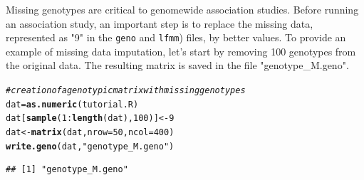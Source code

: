 \documentclass[12pt,a4paper,oneside]{article}\usepackage[]{graphicx}\usepackage[]{color}
\makeatletter
\newcommand{\hlnum}[1]{\textcolor[rgb]{0.686,0.059,0.569}{#1}}%
\newcommand{\hlstr}[1]{\textcolor[rgb]{0.192,0.494,0.8}{#1}}%
\newcommand{\hlcom}[1]{\textcolor[rgb]{0.678,0.584,0.686}{\textit{#1}}}%
\newcommand{\hlopt}[1]{\textcolor[rgb]{0,0,0}{#1}}%
\newcommand{\hlstd}[1]{\textcolor[rgb]{0.345,0.345,0.345}{#1}}%
\newcommand{\hlkwb}[1]{\textcolor[rgb]{0.69,0.353,0.396}{#1}}%
\newcommand{\hlkwc}[1]{\textcolor[rgb]{0.333,0.667,0.333}{#1}}%
\newcommand{\hlkwd}[1]{\textcolor[rgb]{0.737,0.353,0.396}{\textbf{#1}}}%
\newenvironment{kframe}{%
 \def\at@end@of@kframe{}%
 \ifinner\ifhmode%
  \def\at@end@of@kframe{\end{minipage}}%
  \begin{minipage}{\columnwidth}%
 \fi\fi%
 \def\FrameCommand##1{\hskip\@totalleftmargin \hskip-\fboxsep
 \colorbox{shadecolor}{##1}\hskip-\fboxsep
     \hskip-\linewidth \hskip-\@totalleftmargin \hskip\columnwidth}%
 \MakeFramed {\advance\hsize-\width
   \@totalleftmargin\z@ \linewidth\hsize
   \@setminipage}}%
 {\par\unskip\endMakeFramed%
 \at@end@of@kframe}
\newenvironment{knitrout}{}{} %
\makeatother
\begin{document}
Missing genotypes are critical to genomewide association studies. Before running an association study, an important step is to replace the missing data, represented as "9" in the {\tt geno} and {\tt lfmm}) files, by better values. To provide an example of missing data imputation, let's start by removing 100 genotypes from the original data.
The resulting matrix is saved in the file "genotype_M.geno".
\begin{knitrout}
\color{fgcolor}\begin{kframe}
\begin{alltt}
\hlcom{# creation of a genotypic matrix  with missing genotypes}
\hlstd{dat} \hlkwb{=} \hlkwd{as.numeric}\hlstd{(tutorial.R)}
\hlstd{dat[}\hlkwd{sample}\hlstd{(}\hlnum{1}\hlopt{:}\hlkwd{length}\hlstd{(dat),} \hlnum{100}\hlstd{)]} \hlkwb{<-}  \hlnum{9}
\hlstd{dat} \hlkwb{<-} \hlkwd{matrix}\hlstd{(dat,} \hlkwc{nrow} \hlstd{=} \hlnum{50}\hlstd{,} \hlkwc{ncol} \hlstd{=} \hlnum{400}\hlstd{)}
\hlkwd{write.geno}\hlstd{(dat,} \hlstr{"genotype_M.geno"}\hlstd{)}
\end{alltt}
\begin{verbatim}
## [1] "genotype_M.geno"
\end{verbatim}
\end{kframe}
\end{knitrout}
\end{document}
